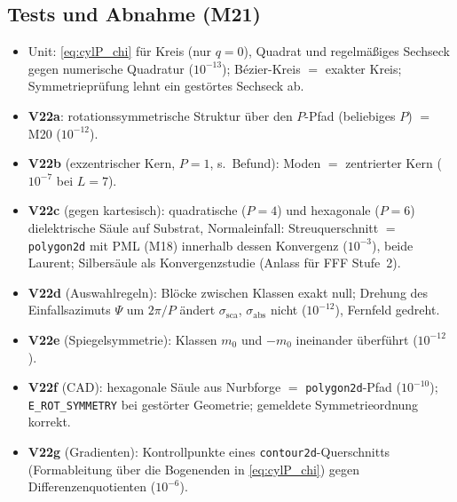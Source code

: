 \subsection{Tests und Abnahme (M21)}
\begin{itemize}[nosep]
  \item Unit: \eqref{eq:cylP_chi} für Kreis (nur $q=0$), Quadrat und regelmäßiges Sechseck gegen numerische Quadratur
        ($10^{-13}$); Bézier-Kreis $=$ exakter Kreis; Symmetrieprüfung lehnt ein gestörtes Sechseck ab.
  \item \textbf{V22a}: rotationssymmetrische Struktur über den $P$-Pfad (beliebiges $P$) $=$ M20 ($10^{-12}$).
  \item \textbf{V22b} (exzentrischer Kern, $P=1$, s.\ Befund): Moden $=$ zentrierter Kern ($10^{-7}$ bei $L=7$).
  \item \textbf{V22c} (gegen kartesisch): quadratische ($P=4$) und hexagonale ($P=6$) dielektrische Säule auf Substrat,
        Normaleinfall: Streuquerschnitt $=$ \verb|polygon2d| mit PML (M18) innerhalb dessen Konvergenz ($10^{-3}$),
        beide Laurent; Silbersäule als Konvergenzstudie (Anlass für FFF Stufe~2).
  \item \textbf{V22d} (Auswahlregeln): Blöcke zwischen Klassen exakt null; Drehung des Einfallsazimuts $\Psi$ um $2\pi/P$
        ändert $\sigma_{\text{sca}}$, $\sigma_{\text{abs}}$ nicht ($10^{-12}$), Fernfeld gedreht.
  \item \textbf{V22e} (Spiegelsymmetrie): Klassen $m_0$ und $-m_0$ ineinander überführt ($10^{-12}$).
  \item \textbf{V22f} (CAD): hexagonale Säule aus Nurbforge $=$ \verb|polygon2d|-Pfad ($10^{-10}$); \verb|E_ROT_SYMMETRY|
        bei gestörter Geometrie; gemeldete Symmetrieordnung korrekt.
  \item \textbf{V22g} (Gradienten): Kontrollpunkte eines \verb|contour2d|-Querschnitts (Formableitung über die
        Bogenenden in \eqref{eq:cylP_chi}) gegen Differenzenquotienten ($10^{-6}$).
\end{itemize}


